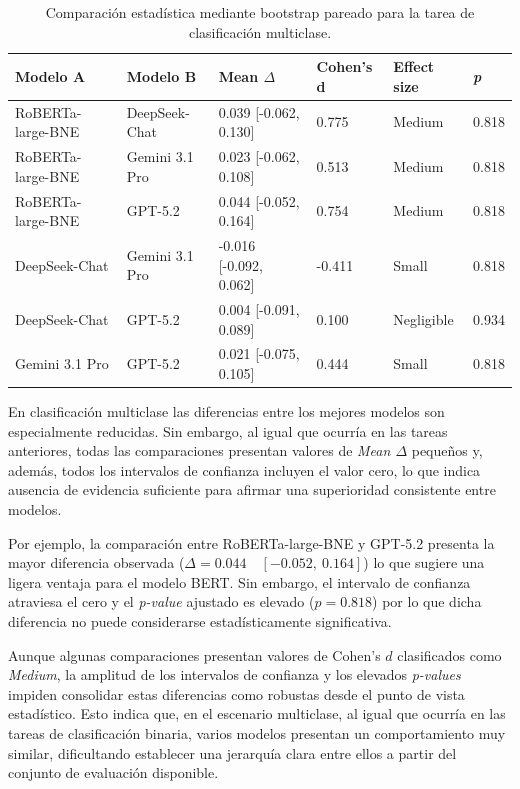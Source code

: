 \begin{table}[H]
	\centering
	\small
	\begin{tabular}{llllll}
		\hline
		\textbf{Modelo A} & \textbf{Modelo B} & \textbf{Mean $\Delta$} & \textbf{Cohen's d} & \textbf{Effect size} & \textbf{\textit{p}} \\
		\hline
		RoBERTa-large-BNE & DeepSeek-Chat & 0.039 [-0.062, 0.130] & 0.775 & Medium & 0.818 \\
		RoBERTa-large-BNE & Gemini 3.1 Pro & 0.023 [-0.062, 0.108] & 0.513 & Medium & 0.818 \\
		RoBERTa-large-BNE & GPT-5.2 & 0.044 [-0.052, 0.164] & 0.754 & Medium & 0.818 \\
		DeepSeek-Chat & Gemini 3.1 Pro & -0.016 [-0.092, 0.062] & -0.411 & Small & 0.818 \\
		DeepSeek-Chat & GPT-5.2 & 0.004 [-0.091, 0.089] & 0.100 & Negligible & 0.934 \\
		Gemini 3.1 Pro & GPT-5.2 & 0.021 [-0.075, 0.105] & 0.444 & Small & 0.818 \\
		\hline
	\end{tabular}
	\caption{Comparación estadística mediante bootstrap pareado para la tarea de clasificación multiclase.}
	\label{tab:bootstrap_multi}
\end{table}

En clasificación multiclase las diferencias entre los mejores modelos son especialmente reducidas. Sin embargo, al igual que ocurría en las tareas anteriores, todas las comparaciones presentan valores de \textit{Mean $\Delta$} pequeños y, además, todos los intervalos de confianza incluyen el valor cero, lo que indica ausencia de evidencia suficiente para afirmar una superioridad consistente entre modelos.

Por ejemplo, la comparación entre RoBERTa-large-BNE y GPT-5.2 presenta la mayor diferencia observada ($\Delta = 0.044 \quad [-0.052,\ 0.164]$) lo que sugiere una ligera ventaja para el modelo BERT. Sin embargo, el intervalo de confianza atraviesa el cero y el \textit{p-value} ajustado es elevado ($p = 0.818$) por lo que dicha diferencia no puede considerarse estadísticamente significativa.

Aunque algunas comparaciones presentan valores de Cohen’s \(d\) clasificados como \textit{Medium}, la amplitud de los intervalos de confianza y los elevados \textit{p-values} impiden consolidar estas diferencias como robustas desde el punto de vista estadístico. Esto indica que, en el escenario multiclase, al igual que ocurría en las tareas de clasificación binaria, varios modelos presentan un comportamiento muy similar, dificultando establecer una jerarquía clara entre ellos a partir del conjunto de evaluación disponible.

